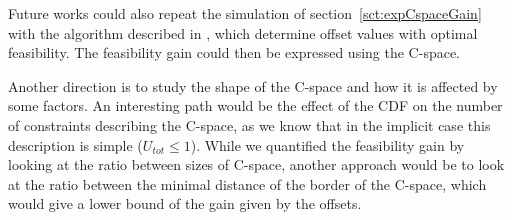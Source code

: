 \documentclass[conference]{IEEEtran}
\begin{document}
Future works could also repeat the simulation of section~\ref{sct:expCspaceGain} with the algorithm described in \cite{grenier2008pushing}, which determine offset values with optimal feasibility. The
feasibility gain could then be expressed using the C-space.

Another direction is to study the shape of the C-space and how it is affected by some factors. An
interesting path would be the effect of the CDF on the number of constraints describing the C-space,
as we know that in the implicit case this description is simple ($U_{tot} \leqslant 1$). While we
quantified the feasibility gain by looking at the ratio between sizes of C-space, another approach
would be to look at the ratio between the minimal distance of the border of the C-space, which would
give a lower bound of the gain given by the offsets.












%
%
%




\end{document}
